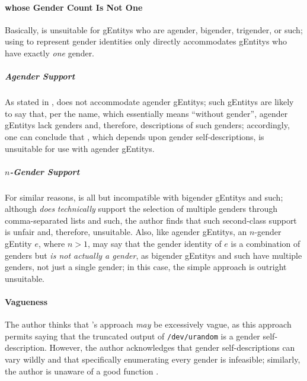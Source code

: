 \documentclass{article}
\theoremstyle{remark}
\begin{document}
\paragraph{ whose Gender Count Is Not One}\label{sec:gender1non1gender}
Basically,  is unsuitable for \glspl{gEntity} who are agender, bigender, trigender, or such; using  to represent gender identities only directly accommodates \glspl{gEntity} who have exactly \emph{one} gender.
\subparagraph{Agender Support}
As stated in ,  does not accommodate agender \glspl{gEntity}; such \glspl{gEntity} are likely to say that,\cite{healthline-agender}\cite{lgbtqia-wiki-agender} per the name, which essentially means ``without gender'',\cite{lgbtqia-wiki-agender} agender \glspl{gEntity} lack genders and, therefore, descriptions of such genders; accordingly, one can conclude that , which depends upon gender self-descriptions, is unsuitable for use with agender \glspl{gEntity}.
\subparagraph{\(n\)-Gender Support}
For similar reasons,  is all but incompatible with bigender \glspl{gEntity} and such; although  \emph{does} \emph{technically} support the selection of multiple genders through comma-separated lists and such, the author finds that such second-class support is unfair and, therefore, unsuitable.  Also, like agender \glspl{gEntity}, an \(n\)-gender \gls{gEntity} \(e\), where \(n > 1\), may say that the gender identity of \(e\) is a combination of genders but \emph{is not actually a gender}, as bigender \glspl{gEntity} and such have multiple genders, not just a single gender;\cite{nonbinaryWikiBigender} in this case, the simple  approach is outright unsuitable.

\paragraph{Vagueness}\label{sec:gender1vagueness}
The author thinks that 's  approach \emph{may} be excessively vague, as this  approach permits saying that the truncated output of \texttt{/dev/urandom} is a gender self-description.  However, the author acknowledges that gender self-descriptions can vary wildly and that specifically enumerating every gender is infeasible; similarly, the author is unaware of a good function  \AgdaSymbol{:}   .
\end{document}
